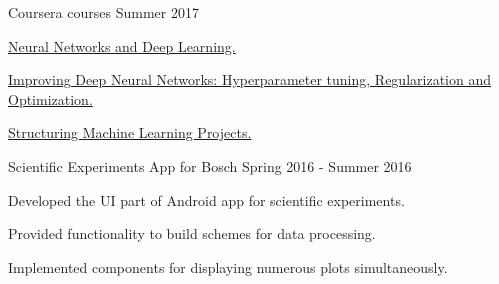 

\begin{cvprojects}

  \cvproject
    {Coursera courses} %
    {Summer 2017} %
    {
      \begin{cvitems} %
        \item {\href{https://www.coursera.org/account/accomplishments/certificate/2CZYKZ48RVVF}{Neural Networks and Deep Learning.}}
        \item {\href{https://www.coursera.org/account/accomplishments/certificate/HKWGMRF5H2MQ}{Improving Deep Neural Networks: Hyperparameter tuning, Regularization and Optimization.}}
        \item {\href{https://www.coursera.org/account/accomplishments/certificate/T4CAU7ZQRG7C}{Structuring Machine Learning Projects.}}
      \end{cvitems}
    }
    
  \cvproject
    {Scientific Experiments App for Bosch} %
    {Spring 2016 - Summer 2016} %
    {
      \begin{cvitems} %
        \item {Developed the UI part of Android app for scientific experiments.}
        \item {Provided functionality to build schemes for data processing.}
        \item {Implemented components for displaying numerous plots simultaneously.}
      \end{cvitems}
    }

\end{cvprojects}
